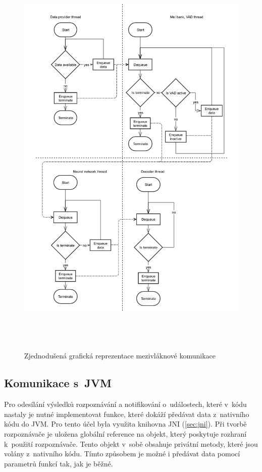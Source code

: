 \begin{figure}[H]
	\centering
		\includegraphics[height=20cm]{obrazky-figures/thread_communication.pdf}
        \caption{Zjednodušená grafická reprezentace mezivláknové komunikace}
        \label{fig:thread_comm}
\end{figure}

\subsection{Komunikace s~JVM}
Pro odesílání výsledků rozpoznávání a notifikování o~událostech, které v~kódu nastaly je nutné implementovat funkce, které dokáží předávat data z~nativního kódu do JVM. Pro tento účel byla využita knihovna JNI (\ref{sec:jni}). Při tvorbě rozpoznávače je uložena globální reference na objekt, který poskytuje rozhraní k~použití rozpoznávače. Tento objekt v~sobě obsahuje privátní metody, které jsou volány z~nativního kódu. Tímto způsobem je možné i předávat data pomocí parametrů funkcí tak, jak je běžné.

